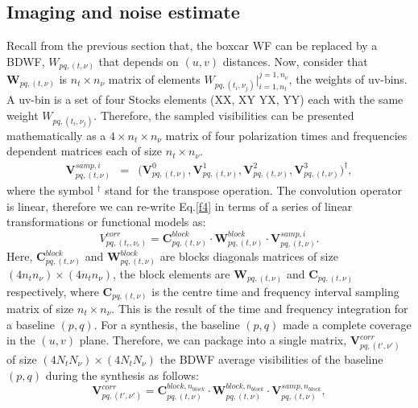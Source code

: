 \documentclass[useAMS,usenatbib]{mn2e}
\begin{document}
\subsection{Imaging and noise estimate}
\label{sec:imaging}
Recall from the previous section that, the boxcar WF can be replaced by a BDWF, $W_{pq,(t,\nu)}$ that depends 
on $(u,v)$ distances. Now, consider that $\mathcal{\textbf{W}}_{pq,(t,\nu)}$ is  $n_t \times n_{\nu}$ matrix of elements 
$W_{pq,(t_i,\nu_j)}\Big|_{i=1,n_t}^{j=1, n_{\nu}}$, the weights of uv-bins. A uv-bin is a set of four Stocks elements (XX, XY YX, YY) each 
with the same weight $W_{pq,(t_i,\nu_j)}$. Therefore, the sampled visibilities can be presented mathematically as a $4\times n_t\times 
n_{\nu}$ matrix of four polarization times and frequencies dependent matrices each of size $n_t\times n_{\nu}$.
\begin{eqnarray*}
\mathbf{V}_{pq,(t,\nu)}^{samp,i}&=&\Bigg(\mathbf{V}_{pq,(t,\nu)}^{0},\mathbf { V } 
^1_{pq,(t,\nu)},\mathbf{V}^2_{pq,(t,\nu)},\mathbf{V}_{pq,(t,\nu)}^{3 } \Bigg)^{\dagger}, \label{eqx:conv}
\end{eqnarray*}
where the symbol $^{\dagger}$ stand for the transpose operation. The convolution operator is linear, therefore we can re-write Eq.\ref{f4} 
in terms of a series of linear transformations or functional models as:
\begin{equation}
V_{pq,(t_c,\nu_c)}^{corr}= \mathbf{C}_{pq,(t,\nu)}^{block}\cdot\mathbf{W}_{pq,(t,\nu)}^{block}\cdot 
\mathbf{V}_{pq,(t,\nu)}^{samp,i}.\label{eqbb:linear}
\end{equation}
Here, $\mathbf{C}_{pq,(t,\nu)}^{block}$ and $\mathbf{W}_{pq,(t,\nu)}^{block}$ are  blocks diagonals matrices of size $(4n_t 
n_{\nu})\times(4n_t n_{\nu})$, the block elements are $\mathcal{\textbf{W}}_{pq,(t,\nu)}$ and $\mathbf{C}_{pq,(t,\nu)}$ 
respectively, where $\mathbf{C}_{pq,(t,\nu)}$ is the centre time and frequency interval sampling matrix of size $n_t\times 
n_{\nu}$. This
is the result of the time and frequency integration for a baseline $(p,q)$.
For a synthesis, the baseline $(p,q)$ made a complete  coverage in the $(u,v)$ plane. Therefore, we can  
package into a single matrix, $\mathbf{V}_{pq,(t',\nu')}^{corr}$ of size $(4N_t N_{\nu})\times (4N_t N_{\nu})$ the 
BDWF average visibilities of the  baseline $(p,q)$ during the synthesis as follows: 
\begin{equation}
\mathbf{V}_{pq,(t',\nu')}^{corr}=\mathbf{C}_{pq,(t,\nu)}^{block,n_{block}}\cdot 
\mathbf{W}_{pq,(t,\nu)}^{block,n_{block}}\cdot\mathbf{V}_{pq,(t,\nu)}^{samp,n_{block}},\label{eq2:block}
\end{equation}
\end{document}
